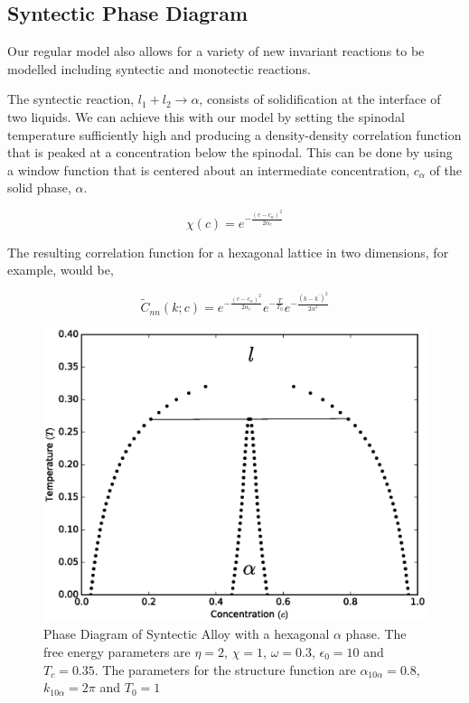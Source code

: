 \documentclass[showkeys, prb, reprint]{revtex4-1}
\newcommand{\f}{\frac}
\begin{document}
\subsection{Syntectic Phase Diagram}

Our regular model also allows for a variety of new invariant reactions to be modelled including syntectic and monotectic reactions.

The syntectic reaction, $l_1 + l_2 \rightarrow \alpha $, consists of solidification at the interface of two liquids. We can achieve this with our model by setting the spinodal temperature sufficiently high and producing a density-density correlation function that is peaked at a concentration below the spinodal. This can be done by using a window function that is centered about an intermediate concentration, $c_\alpha$ of the solid phase, $\alpha$. 

\begin{equation}
  \chi(c) = e^{- \f{(c - c_\alpha)^2}{2 \alpha_c}}
\end{equation}

The resulting correlation function for a hexagonal lattice in two dimensions, for example, would be,

\begin{equation}
  \tilde{C}_{nn}(k; c) = e^{-\f{(c - c_\alpha)^2}{2 \alpha_c}} e^{-\f{T}{T_0}} e^{-\f{(k - k^\prime)^2}{2\alpha^2}}
\end{equation}

\begin{figure}
	\includegraphics[scale=0.3]{syntectic.eps}
	\caption{\label{syntectic} Phase Diagram of Syntectic Alloy with a hexagonal $\alpha$ phase. The free energy parameters are $\eta=2$, $\chi=1$, $\omega=0.3$, $\epsilon_0 = 10$ and $T_c=0.35$. The parameters for the structure function are $\alpha_{10\alpha} = 0.8$, $k_{10\alpha} = 2\pi$ and $T_0 = 1$}
\end{figure}
\end{document}
